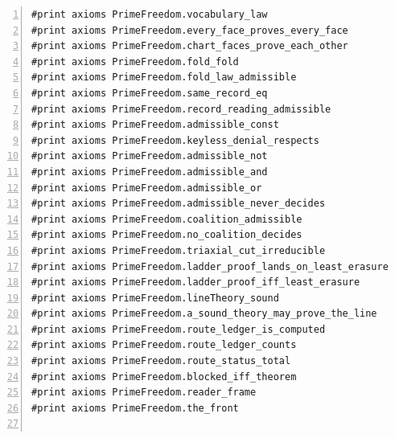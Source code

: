\documentclass[10pt]{article}
\newcommand{\leansize}{\fontsize{5.5pt}{6.75pt}\selectfont}
\begin{document}
\begin{multicols}{2}
\begin{Verbatim}[numbers=left,firstnumber=1,numbersep=3pt,xleftmargin=2.6em,breaklines=true,breakanywhere=true,breakautoindent=false,breakindent=1.4em,breaksymbolleft={},breakanywheresymbolpre={},fontsize=\leansize]
#print axioms PrimeFreedom.vocabulary_law
#print axioms PrimeFreedom.every_face_proves_every_face
#print axioms PrimeFreedom.chart_faces_prove_each_other
#print axioms PrimeFreedom.fold_fold
#print axioms PrimeFreedom.fold_law_admissible
#print axioms PrimeFreedom.same_record_eq
#print axioms PrimeFreedom.record_reading_admissible
#print axioms PrimeFreedom.admissible_const
#print axioms PrimeFreedom.keyless_denial_respects
#print axioms PrimeFreedom.admissible_not
#print axioms PrimeFreedom.admissible_and
#print axioms PrimeFreedom.admissible_or
#print axioms PrimeFreedom.admissible_never_decides
#print axioms PrimeFreedom.coalition_admissible
#print axioms PrimeFreedom.no_coalition_decides
#print axioms PrimeFreedom.triaxial_cut_irreducible
#print axioms PrimeFreedom.ladder_proof_lands_on_least_erasure
#print axioms PrimeFreedom.ladder_proof_iff_least_erasure
#print axioms PrimeFreedom.lineTheory_sound
#print axioms PrimeFreedom.a_sound_theory_may_prove_the_line
#print axioms PrimeFreedom.route_ledger_is_computed
#print axioms PrimeFreedom.route_ledger_counts
#print axioms PrimeFreedom.route_status_total
#print axioms PrimeFreedom.blocked_iff_theorem
#print axioms PrimeFreedom.reader_frame
#print axioms PrimeFreedom.the_front


\end{Verbatim}
\end{multicols}
\end{document}
